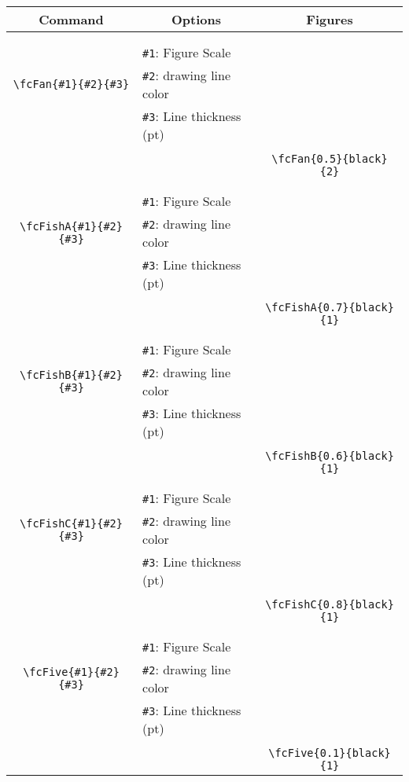 \documentclass[x11names]{article}
\begin{document}
\begin{table}[H]\centering\begin{tabular}{|c|l|c|}\hline {\bf Command}& \multicolumn{1}{c|}{{\bf Options}} & {\bf Figures}\\  \hline	&&\multirow{5}{*}{\fcFan{0.5}{black}{2}}\\	&&\\	&\verb|#1|: Figure Scale &\\	\verb|\fcFan{#1}{#2}{#3}|&	\verb|#2|: drawing line color &\\	&\verb|#3|: Line thickness (pt) &\\ &&\\&&	\verb|\fcFan{0.5}{black}{2}|\\\hline 	
	&&\multirow{5}{*}{\fcFishA{0.7}{black}{1}}\\	&&\\	&\verb|#1|: Figure Scale &\\	\verb|\fcFishA{#1}{#2}{#3}|&	\verb|#2|: drawing line color &\\	&\verb|#3|: Line thickness (pt) &\\ &&\\&&	\verb|\fcFishA{0.7}{black}{1}|\\\hline 	
	&&\multirow{5}{*}{\fcFishB{0.6}{black}{1}}\\	&&\\	&\verb|#1|: Figure Scale &\\	\verb|\fcFishB{#1}{#2}{#3}|&	\verb|#2|: drawing line color &\\	&\verb|#3|: Line thickness (pt) &\\ &&\\&&	\verb|\fcFishB{0.6}{black}{1}|\\\hline 	
	&&\multirow{5}{*}{\fcFishC{0.8}{black}{1}}\\	&&\\	&\verb|#1|: Figure Scale &\\	\verb|\fcFishC{#1}{#2}{#3}|&	\verb|#2|: drawing line color &\\	&\verb|#3|: Line thickness (pt) &\\ &&\\&&	\verb|\fcFishC{0.8}{black}{1}|\\\hline 	
	&&\multirow{5}{*}{\fcFive{0.1}{black}{1}}\\	&&\\	&\verb|#1|: Figure Scale &\\	\verb|\fcFive{#1}{#2}{#3}|&	\verb|#2|: drawing line color &\\	&\verb|#3|: Line thickness (pt) &\\ &&\\&&	\verb|\fcFive{0.1}{black}{1}|\\\hline 	

\end{tabular}
\end{table}
\end{document}
